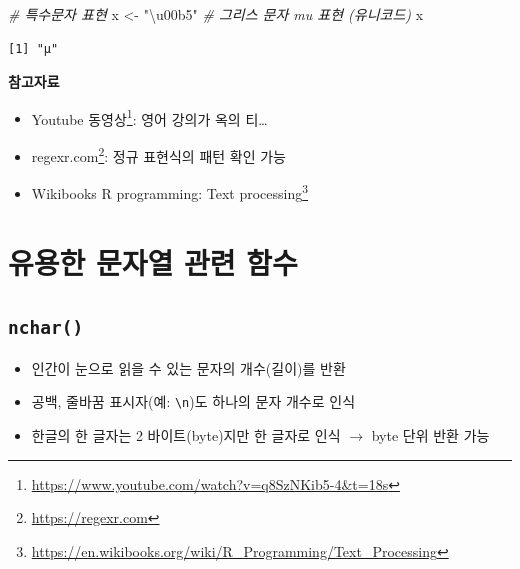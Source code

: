 \documentclass[
  11pt,
]{krantz}
\makeatletter
\newenvironment{Shaded}{\begin{snugshade}}{\end{snugshade}}
\newcommand{\CommentTok}[1]{\textcolor[rgb]{0.37,0.37,0.37}{\textit{#1}}}
\newcommand{\NormalTok}[1]{#1}
\newcommand{\StringTok}[1]{\textcolor[rgb]{0.5,0.5,0.5}{#1}}
\providecommand{\tightlist}{%
  \setlength{\itemsep}{0pt}\setlength{\parskip}{0pt}}
\renewcommand{\href}[2]{#2\footnote{\url{#1}}}
\newenvironment{kframe}{%
\medskip{}
\setlength{\fboxsep}{.8em}
 \def\at@end@of@kframe{}%
 \ifinner\ifhmode%
  \def\at@end@of@kframe{\end{minipage}}%
  \begin{minipage}{\columnwidth}%
 \fi\fi%
 \def\FrameCommand##1{\hskip\@totalleftmargin \hskip-\fboxsep
 \colorbox{shadecolor}{##1}\hskip-\fboxsep
     \hskip-\linewidth \hskip-\@totalleftmargin \hskip\columnwidth}%
 \MakeFramed {\advance\hsize-\width
   \@totalleftmargin\z@ \linewidth\hsize
   \@setminipage}}%
 {\par\unskip\endMakeFramed%
 \at@end@of@kframe}
\newenvironment{rmdblock}[1]
  {
  \begin{itemize}
  \renewcommand{\labelitemi}{
    \raisebox{-.7\height}[0pt][0pt]{
      {\setkeys{Gin}{width=3em,keepaspectratio}\texttt{[image: images/\#1]}}
    }
  }
  \setlength{\fboxsep}{1em}
  \begin{kframe}
  \item
  }
  {
  \end{kframe}
  \end{itemize}
  }
\newenvironment{rmdtip}
  {\begin{rmdblock}{tip}}
  {\end{rmdblock}}
\makeatother
\begin{document}
\begin{Shaded}
\begin{Highlighting}[]
\CommentTok{# 특수문자 표현}
\NormalTok{x <-}\StringTok{ "\textbackslash{}u00b5"} \CommentTok{# 그리스 문자 mu 표현 (유니코드)}
\NormalTok{x}
\end{Highlighting}
\end{Shaded}

\begin{verbatim}
[1] "μ"
\end{verbatim}

\normalsize

\footnotesize

\begin{rmdtip}
\begin{rmdtip}

\textbf{참고자료}

\begin{itemize}
\tightlist
\item
  \href{https://www.youtube.com/watch?v=q8SzNKib5-4\&t=18s}{Youtube 동영상}: 영어 강의가 옥의 티\ldots{}
\item
  \href{https://regexr.com}{regexr.com}: 정규 표현식의 패턴 확인 가능
\item
  \href{https://en.wikibooks.org/wiki/R_Programming/Text_Processing}{Wikibooks R programming: Text processing}
\end{itemize}

\end{rmdtip}
\end{rmdtip}

\normalsize

\hypertarget{uxc720uxc6a9uxd55c-uxbb38uxc790uxc5f4-uxad00uxb828-uxd568uxc218}{%
\section{유용한 문자열 관련 함수}\label{uxc720uxc6a9uxd55c-uxbb38uxc790uxc5f4-uxad00uxb828-uxd568uxc218}}

\hypertarget{nchar}{%
\subsection{\texorpdfstring{\textbf{\texttt{nchar()}}}{nchar()}}\label{nchar}}

\begin{itemize}
\tightlist
\item
  인간이 눈으로 읽을 수 있는 문자의 개수(길이)를 반환
\item
  공백, 줄바꿈 표시자(예: \texttt{\textbackslash{}n})도 하나의 문자 개수로 인식
\item
  한글의 한 글자는 2 바이트(byte)지만 한 글자로 인식 \(\rightarrow\) byte 단위 반환 가능
\end{itemize}
\end{document}
